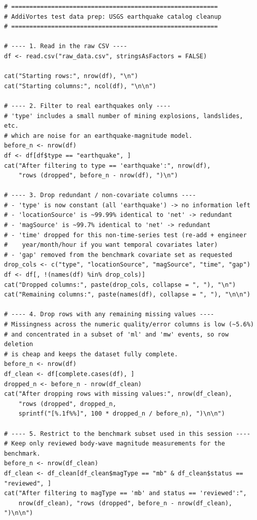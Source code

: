 \documentclass[11pt]{article}
\begin{document}
\begin{lstlisting}[style=Rstyle, caption={R script used to clean the raw USGS earthquake catalog extract.}, label={lst:clean}]
# =========================================================
# AddiVortes test data prep: USGS earthquake catalog cleanup
# =========================================================

# ---- 1. Read in the raw CSV ----
df <- read.csv("raw_data.csv", stringsAsFactors = FALSE)

cat("Starting rows:", nrow(df), "\n")
cat("Starting columns:", ncol(df), "\n\n")

# ---- 2. Filter to real earthquakes only ----
# 'type' includes a small number of mining explosions, landslides, etc.
# which are noise for an earthquake-magnitude model.
before_n <- nrow(df)
df <- df[df$type == "earthquake", ]
cat("After filtering to type == 'earthquake':", nrow(df),
    "rows (dropped", before_n - nrow(df), ")\n")

# ---- 3. Drop redundant / non-covariate columns ----
# - 'type' is now constant (all 'earthquake') -> no information left
# - 'locationSource' is ~99.99% identical to 'net' -> redundant
# - 'magSource' is ~99.7% identical to 'net' -> redundant
# - 'time' dropped for this non-time-series test (re-add + engineer
#    year/month/hour if you want temporal covariates later)
# - 'gap' removed from the benchmark covariate set as requested
drop_cols <- c("type", "locationSource", "magSource", "time", "gap")
df <- df[, !(names(df) %in% drop_cols)]
cat("Dropped columns:", paste(drop_cols, collapse = ", "), "\n")
cat("Remaining columns:", paste(names(df), collapse = ", "), "\n\n")

# ---- 4. Drop rows with any remaining missing values ----
# Missingness across the numeric quality/error columns is low (~5.6%)
# and concentrated in a subset of 'ml' and 'mw' events, so row deletion
# is cheap and keeps the dataset fully complete.
before_n <- nrow(df)
df_clean <- df[complete.cases(df), ]
dropped_n <- before_n - nrow(df_clean)
cat("After dropping rows with missing values:", nrow(df_clean),
    "rows (dropped", dropped_n,
    sprintf("[%.1f%%]", 100 * dropped_n / before_n), ")\n\n")

# ---- 5. Restrict to the benchmark subset used in this session ----
# Keep only reviewed body-wave magnitude measurements for the benchmark.
before_n <- nrow(df_clean)
df_clean <- df_clean[df_clean$magType == "mb" & df_clean$status == "reviewed", ]
cat("After filtering to magType == 'mb' and status == 'reviewed':",
    nrow(df_clean), "rows (dropped", before_n - nrow(df_clean), ")\n\n")


\end{lstlisting}
\end{document}
